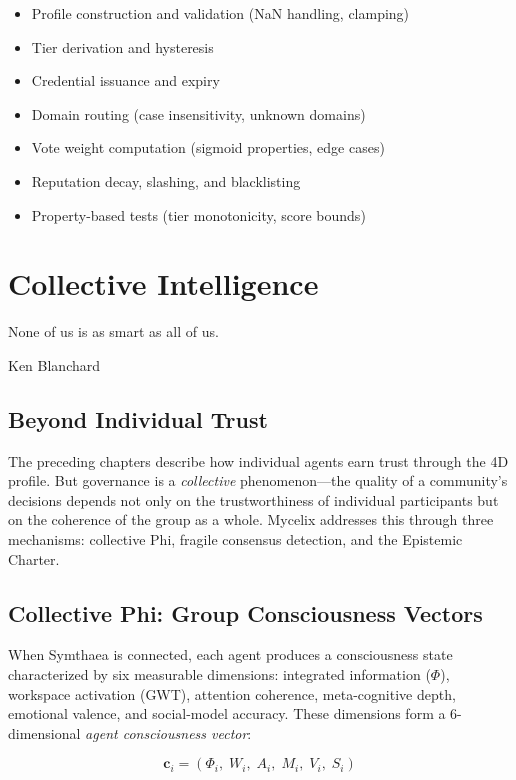 \documentclass[12pt]{book}
\begin{document}
\begin{itemize}
  \item Profile construction and validation (NaN handling, clamping)
  \item Tier derivation and hysteresis
  \item Credential issuance and expiry
  \item Domain routing (case insensitivity, unknown domains)
  \item Vote weight computation (sigmoid properties, edge cases)
  \item Reputation decay, slashing, and blacklisting
  \item Property-based tests (tier monotonicity, score bounds)
\end{itemize}


\chapter{Collective Intelligence}

\epigraph{None of us is as smart as all of us.}{Ken Blanchard}

\section{Beyond Individual Trust}

The preceding chapters describe how individual agents earn trust through the 4D
profile. But governance is a \emph{collective} phenomenon---the quality of a
community's decisions depends not only on the trustworthiness of individual
participants but on the coherence of the group as a whole. Mycelix addresses
this through three mechanisms: collective Phi, fragile consensus detection, and
the Epistemic Charter.

\section{Collective Phi: Group Consciousness Vectors}

When Symthaea is connected, each agent produces a consciousness state
characterized by six measurable dimensions: integrated information ($\Phi$),
workspace activation (GWT), attention coherence, meta-cognitive depth,
emotional valence, and social-model accuracy. These dimensions form a
6-dimensional \emph{agent consciousness vector}:

\begin{equation}
  \mathbf{c}_i = (\Phi_i,\; W_i,\; A_i,\; M_i,\; V_i,\; S_i)
\end{equation}
\end{document}
